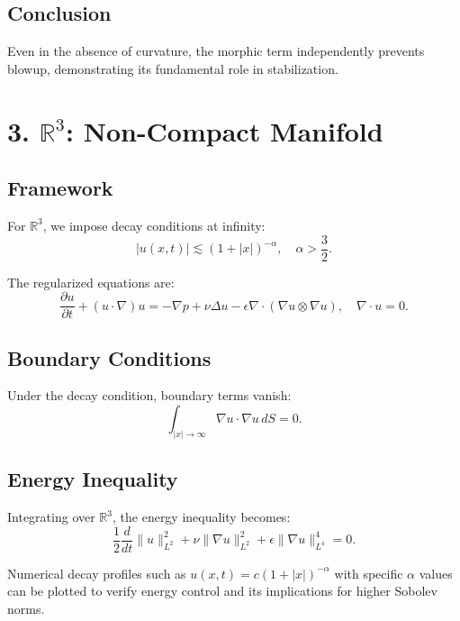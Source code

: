 \documentclass[12pt]{article}
\begin{document}
\subsection*{Conclusion}
Even in the absence of curvature, the morphic term independently prevents blowup, demonstrating its fundamental role in stabilization.

\section*{3. \( \mathbb{R}^3 \): Non-Compact Manifold}

\subsection*{Framework}
For \( \mathbb{R}^3 \), we impose decay conditions at infinity:
\begin{equation}
|u(x, t)| \lesssim (1 + |x|)^{-\alpha}, \quad \alpha > \frac{3}{2}.
\end{equation}

The regularized equations are:
\begin{equation}
\frac{\partial u}{\partial t} + (u \cdot \nabla)u = -\nabla p + \nu \Delta u - \epsilon \nabla \cdot (\nabla u \otimes \nabla u), \quad \nabla \cdot u = 0.
\end{equation}

\subsection*{Boundary Conditions}
Under the decay condition, boundary terms vanish:
\begin{equation}
\int_{|x| \to \infty} \nabla u \cdot \nabla u \, dS = 0.
\end{equation}

\subsection*{Energy Inequality}
Integrating over \( \mathbb{R}^3 \), the energy inequality becomes:
\begin{equation}
\frac{1}{2} \frac{d}{dt} \| u \|_{L^2}^2 + \nu \| \nabla u \|_{L^2}^2 + \epsilon \| \nabla u \|_{L^4}^4 = 0.
\end{equation}

Numerical decay profiles such as \( u(x, t) = c (1+|x|)^{-\alpha} \) with specific \( \alpha \) values can be plotted to verify energy control and its implications for higher Sobolev norms.
	
\end{document}
